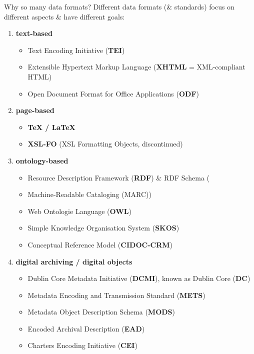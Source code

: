 \begin{frame}{Why so many data formats?}
\small
Different data formats (\& standards) focus on different aspects \& have different goals:
\begin{enumerate}
\item \textbf{text-based}
	\begin{itemize}\scriptsize
	\item Text Encoding Initiative (\textbf{TEI})
	\item Extensible Hypertext Markup Language (\textbf{XHTML} = XML-compliant HTML)
	\item Open Document Format for Office Applications (\textbf{ODF})
	\end{itemize}
\item \textbf{page-based}
	\begin{itemize}\footnotesize
	\item \textbf{\TeX{} / \LaTeX{}}
	\item \textbf{XSL-FO} (XSL Formatting Objects, discontinued)
	\end{itemize}
\item \textbf{ontology-based}
	\begin{itemize}\scriptsize
	\item Resource Description Framework (\textbf{RDF}) \& RDF Schema (\item Machine-Readable Cataloging (MARC))
	\item Web Ontologie Language (\textbf{OWL})
	\item Simple Knowledge Organisation System (\textbf{SKOS})
	\item Conceptual Reference Model (\textbf{CIDOC-CRM})
	\end{itemize}
\item \textbf{digital archiving / digital objects}
	\begin{itemize}\scriptsize
	\item Dublin Core Metadata Initiative (\textbf{DCMI}), known as Dublin Core (\textbf{DC})
	\item Metadata Encoding and Transmission Standard (\textbf{METS})
	\item Metadata Object Description Schema (\textbf{MODS})
	\item Encoded Archival Description (\textbf{EAD})
	\item Charters Encoding Initiative (\textbf{CEI})
	\end{itemize}
\end{enumerate}

\end{frame}

